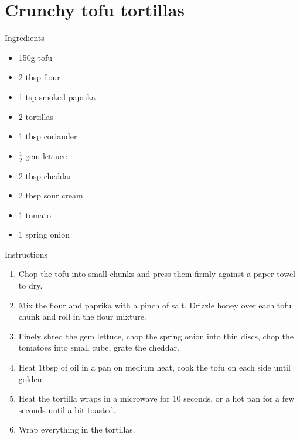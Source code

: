 \documentclass[../dinner.tex]{subfiles}
\begin{document}
	\pagestyle{fancy}
	\fancyhf{}
	\newpage
	\section{Crunchy tofu tortillas}
	\lhead{}
	{\Large Ingredients}
	\begin{multicols}{2}
		\begin{itemize}
			\item 150g tofu
			\item 2 tbsp flour
			\item 1 tsp smoked paprika
			\item 2 tortillas
			\item 1 tbsp coriander
		\end{itemize}
		\columnbreak
		\begin{itemize}
			\item \(\frac{1}{2}\) gem lettuce
			\item 2 tbsp cheddar
			\item 2 tbsp sour cream
			\item 1 tomato
			\item 1 spring onion
		\end{itemize}
	\end{multicols}
	
	{\Large Instructions}
	\begin{enumerate}
		\item Chop the tofu into small chunks and press them firmly against a paper towel to dry.
		\item Mix the flour and paprika with a pinch of salt. Drizzle honey over each tofu chunk and roll in the flour mixture.
		\item Finely shred the gem lettuce, chop the spring onion into thin discs, chop the tomatoes into small cube, grate the cheddar.
		\item Heat 1tbsp of oil in a pan on medium heat, cook the tofu on each side until golden.
		\item Heat the tortilla wraps in a microwave for 10 seconds, or a hot pan for a few seconds until a bit toasted.
		\item Wrap everything in the tortillas.
	\end{enumerate}
\end{document}
